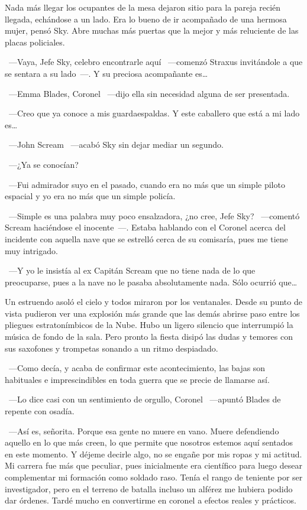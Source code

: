 Nada más llegar los ocupantes de la mesa dejaron sitio para la pareja recién llegada, echándose a un lado. Era lo bueno de ir acompañado de una hermosa mujer, pensó Sky. Abre muchas más puertas que la mejor y más reluciente de las placas policiales.

~---Vaya, Jefe Sky, celebro encontrarle aquí ~---comenzó Straxus invitándole a que se sentara a su lado~---. Y su preciosa acompañante es\dots

~---Emma Blades, Coronel ~---dijo ella sin necesidad alguna de ser presentada.

~---Creo que ya conoce a mis guardaespaldas. Y este caballero que está a mi lado es\dots

~---John Scream ~---acabó Sky sin dejar mediar un segundo.

~---¿Ya se conocían?

~---Fui admirador suyo en el pasado, cuando era no más que un simple piloto espacial y yo era no más que un simple policía.

~---Simple es una palabra muy poco ensalzadora, ¿no cree, Jefe Sky? ~---comentó Scream haciéndose el inocente~---. Estaba hablando con el Coronel acerca del incidente con aquella nave que se estrelló cerca de su comisaría, pues me tiene muy intrigado.

~---Y yo le insistía al ex Capitán Scream que no tiene nada de lo que preocuparse, pues a la nave no le pasaba absolutamente nada. Sólo ocurrió que\dots

Un estruendo asoló el cielo y todos miraron por los ventanales. Desde su punto de vista pudieron ver una explosión más grande que las demás abrirse paso entre los pliegues estratonímbicos de la Nube. Hubo un ligero silencio que interrumpió la música de fondo de la sala. Pero pronto la fiesta disipó las dudas y temores con sus saxofones y trompetas sonando a un ritmo despiadado.

~---Como decía, y acaba de confirmar este acontecimiento, las bajas son habituales e imprescindibles en toda guerra que se precie de llamarse así.

~---Lo dice casi con un sentimiento de orgullo, Coronel ~---apuntó Blades de repente con osadía.

~---Así es, señorita. Porque esa gente no muere en vano. Muere defendiendo aquello en lo que más creen, lo que permite que nosotros estemos aquí sentados en este momento. Y déjeme decirle algo, no se engañe por mis ropas y mi actitud. Mi carrera fue más que peculiar, pues inicialmente era científico para luego desear complementar mi formación como soldado raso. Tenía el rango de teniente por ser investigador, pero en el terreno de batalla incluso un alférez me hubiera podido dar órdenes. Tardé mucho en convertirme en coronel a efectos reales y prácticos.

